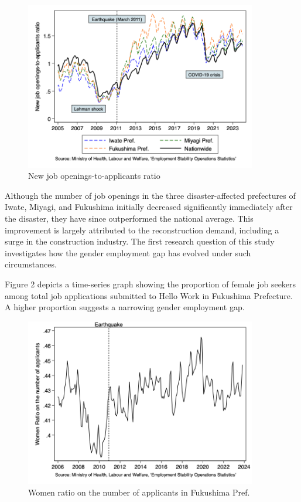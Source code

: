 \documentclass[12pt,halfline,a4paper]{ouparticle}
\begin{document}
\begin{figure}[h!]
    \centering
    \includegraphics[width=0.9\textwidth]{New job openings-to-applicants ratio.png}  %
    \caption{New job openings-to-applicants ratio}
    \label{fig:new_job_openings}
\end{figure}

Although the number of job openings in the three disaster-affected prefectures of Iwate, Miyagi, and Fukushima initially decreased significantly immediately after the disaster, they have since outperformed the national average. This improvement is largely attributed to the reconstruction demand, including a surge in the construction industry. The first research question of this study investigates how the gender employment gap has evolved under such circumstances.

Figure 2 depicts a time-series graph showing the proportion of female job seekers among total job applications submitted to Hello Work in Fukushima Prefecture. A higher proportion suggests a narrowing gender employment gap. 

\begin{figure}[h!]
    \centering
    \includegraphics[width=0.9\textwidth]{Women ratio on the number of applicants in Fukushima.png}  %
    \caption{Women ratio on the number of applicants in Fukushima Pref.}
    \label{fig:women_ratio_fukushima}
\end{figure}
\end{document}
